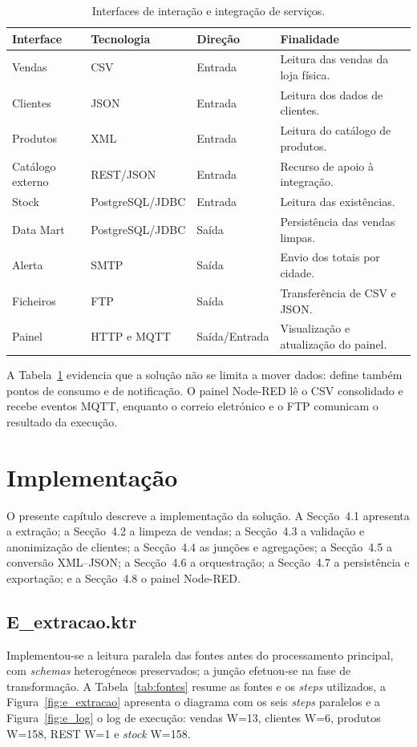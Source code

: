 \documentclass[11pt,a4paper]{article}
\begin{document}
\begin{table}[H]
\centering
\small
\begin{tabular}{|p{2.2cm}|p{3.2cm}|p{1.8cm}|p{5cm}|}
\hline
Interface & Tecnologia & Direção & Finalidade \\ \hline
Vendas & CSV & Entrada & Leitura das vendas da loja física. \\ \hline
Clientes & JSON & Entrada & Leitura dos dados de clientes. \\ \hline
Produtos & XML & Entrada & Leitura do catálogo de produtos. \\ \hline
Catálogo externo & REST/JSON & Entrada & Recurso de apoio à integração. \\ \hline
Stock & PostgreSQL/JDBC & Entrada & Leitura das existências. \\ \hline
Data Mart & PostgreSQL/JDBC & Saída & Persistência das vendas limpas. \\ \hline
Alerta & SMTP & Saída & Envio dos totais por cidade. \\ \hline
Ficheiros & FTP & Saída & Transferência de CSV e JSON. \\ \hline
Painel & HTTP e MQTT & Saída/Entrada & Visualização e atualização do painel. \\ \hline
\end{tabular}
\caption{Interfaces de interação e integração de serviços.}
\label{tab:interfaces}
\end{table}

A Tabela~\ref{tab:interfaces} evidencia que a solução não se limita a mover dados: define também pontos de consumo e de notificação. O painel Node-RED lê o CSV consolidado e recebe eventos MQTT, enquanto o correio eletrónico e o FTP comunicam o resultado da execução.

\section{Implementação}
O presente capítulo descreve a implementação da solução. A Secção~4.1 apresenta a extração; a Secção~4.2 a limpeza de vendas; a Secção~4.3 a validação e anonimização de clientes; a Secção~4.4 as junções e agregações; a Secção~4.5 a conversão XML--JSON; a Secção~4.6 a orquestração; a Secção~4.7 a persistência e exportação; e a Secção~4.8 o painel Node-RED.

\subsection{E\_extracao.ktr}
Implementou-se a leitura paralela das fontes antes do processamento principal, com \textit{schemas} heterogéneos preservados; a junção efetuou-se na fase de transformação. A Tabela~\ref{tab:fontes} resume as fontes e os \textit{steps} utilizados, a Figura~\ref{fig:e_extracao} apresenta o diagrama com os seis \textit{steps} paralelos e a Figura~\ref{fig:e_log} o log de execução: vendas W=13, clientes W=6, produtos W=158, REST W=1 e \textit{stock} W=158.
\end{document}
